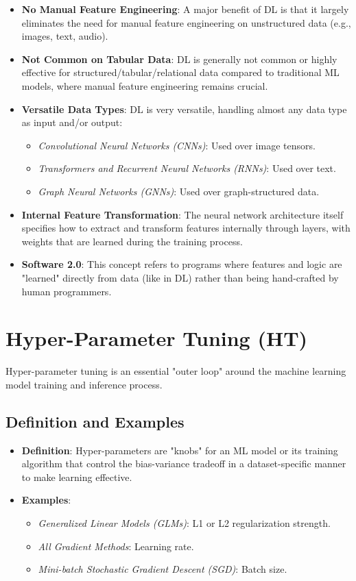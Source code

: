 \documentclass{article}
\begin{document}
\begin{itemize}
    \item \textbf{No Manual Feature Engineering}: A major benefit of DL is that it largely eliminates the need for manual feature engineering on unstructured data (e.g., images, text, audio).
    \item \textbf{Not Common on Tabular Data}: DL is generally not common or highly effective for structured/tabular/relational data compared to traditional ML models, where manual feature engineering remains crucial.
    \item \textbf{Versatile Data Types}: DL is very versatile, handling almost any data type as input and/or output:
    \begin{itemize}
        \item \textit{Convolutional Neural Networks (CNNs)}: Used over image tensors.
        \item \textit{Transformers and Recurrent Neural Networks (RNNs)}: Used over text.
        \item \textit{Graph Neural Networks (GNNs)}: Used over graph-structured data.
    \end{itemize}
    \item \textbf{Internal Feature Transformation}: The neural network architecture itself specifies how to extract and transform features internally through layers, with weights that are learned during the training process.
    \item \textbf{Software 2.0}: This concept refers to programs where features and logic are "learned" directly from data (like in DL) rather than being hand-crafted by human programmers.
\end{itemize}

\section*{Hyper-Parameter Tuning (HT)}
Hyper-parameter tuning is an essential "outer loop" around the machine learning model training and inference process.

\subsection*{Definition and Examples}
\begin{itemize}
    \item \textbf{Definition}: Hyper-parameters are "knobs" for an ML model or its training algorithm that control the bias-variance tradeoff in a dataset-specific manner to make learning effective.
    \item \textbf{Examples}:
    \begin{itemize}
        \item \textit{Generalized Linear Models (GLMs)}: L1 or L2 regularization strength.
        \item \textit{All Gradient Methods}: Learning rate.
        \item \textit{Mini-batch Stochastic Gradient Descent (SGD)}: Batch size.
    \end{itemize}
\end{itemize}
\end{document}
